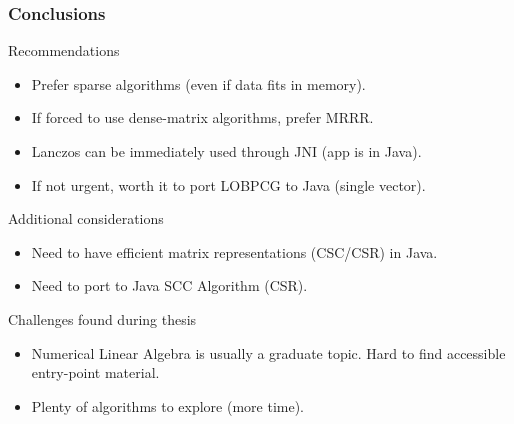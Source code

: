  \begin{frame}
  \frametitle{Conclusions}
  \begin{block}{Recommendations}
    \begin{itemize}
    \item Prefer sparse algorithms (even if data fits in memory).
    \item If forced to use dense-matrix algorithms, prefer MRRR.
    \item Lanczos can be immediately used through JNI (app is in Java).
    \item If not urgent, worth it to port LOBPCG to Java (single vector).
    \end{itemize}
  \end{block}
  \begin{block}{Additional considerations}
    \begin{itemize}
    \item Need to have efficient matrix representations (CSC/CSR) in Java.
    \item Need to port to Java SCC Algorithm (CSR).
    \end{itemize}
  \end{block}
  \begin{block}{Challenges found during thesis}
    \begin{itemize}
    \item Numerical Linear Algebra is usually a graduate topic. Hard to find accessible entry-point material.
    \item Plenty of algorithms to explore (more time).
    \end{itemize}
  \end{block}  
\end{frame}

